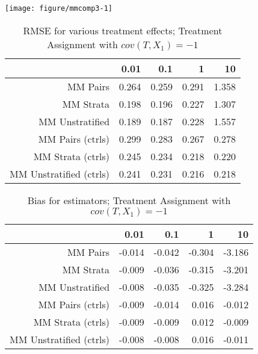 \documentclass[11pt]{article}\usepackage[]{graphicx}\usepackage[]{color}
\makeatletter
\def\maxwidth{ %
  \ifdim\Gin@nat@width>\linewidth
    \linewidth
  \else
    \Gin@nat@width
  \fi
}
\newenvironment{knitrout}{}{} %
\makeatother
\begin{document}
\begin{knitrout}
\color{fgcolor}

{\centering \texttt{[image: figure/mmcomp3-1]} 

}



\end{knitrout}

\begin{table}[ht]
\centering
\begin{tabular}{rrrrr}
  \hline
 & 0.01 & 0.1 & 1 & 10 \\ 
  \hline
MM Pairs & 0.264 & 0.259 & 0.291 & 1.358 \\ 
  MM Strata & 0.198 & 0.196 & 0.227 & 1.307 \\ 
  MM Unstratified & 0.189 & 0.187 & 0.228 & 1.557 \\ 
  MM Pairs (ctrls) & 0.299 & 0.283 & 0.267 & 0.278 \\ 
  MM Strata (ctrls) & 0.245 & 0.234 & 0.218 & 0.220 \\ 
  MM Unstratified (ctrls) & 0.241 & 0.231 & 0.216 & 0.218 \\ 
   \hline
\end{tabular}
\caption{RMSE for various treatment effects; Treatment Assignment with $cov(T, X_1) = -1$} 
\label{tab:mmcomp3}
\end{table}
\begin{table}[ht]
\centering
\begin{tabular}{rrrrr}
  \hline
 & 0.01 & 0.1 & 1 & 10 \\ 
  \hline
MM Pairs & -0.014 & -0.042 & -0.304 & -3.186 \\ 
  MM Strata & -0.009 & -0.036 & -0.315 & -3.201 \\ 
  MM Unstratified & -0.008 & -0.035 & -0.325 & -3.284 \\ 
  MM Pairs (ctrls) & -0.009 & -0.014 & 0.016 & -0.012 \\ 
  MM Strata (ctrls) & -0.009 & -0.009 & 0.012 & -0.009 \\ 
  MM Unstratified (ctrls) & -0.008 & -0.008 & 0.016 & -0.011 \\ 
   \hline
\end{tabular}
\caption{Bias for estimators; Treatment Assignment with $cov(T, X_1) =-1$} 
\label{tab:mmcomp3}
\end{table}
\end{document}
